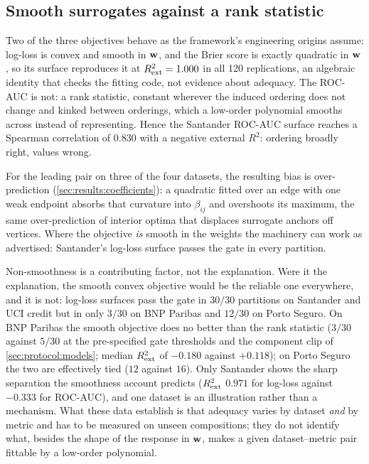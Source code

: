 \subsection{Smooth surrogates against a rank statistic}
\label{sec:disc:smooth}

Two of the three objectives behave as the framework's engineering origins assume: log-loss is convex and smooth in
$\mathbf{w}$, and the Brier score is exactly quadratic in $\mathbf{w}$, so its surface reproduces it at $R^{2}_{\mathrm{ext}} = 1.000$ in all
120 replications, an algebraic identity that checks the fitting code, not evidence about adequacy. The ROC-AUC is
not: a rank statistic, constant wherever the induced ordering does not change and kinked between orderings, which a
low-order polynomial smooths across instead of representing. Hence the Santander ROC-AUC surface reaches a Spearman
correlation of $0.830$ with a negative external $R^2$: ordering broadly right, values wrong.

For the leading pair on three of the four datasets, the resulting bias is over-prediction
(\cref{sec:results:coefficients}): a quadratic fitted over an edge with one weak endpoint absorbs that curvature into
$\beta_{ij}$ and overshoots its maximum, the same over-prediction of interior
optima that displaces surrogate anchors off vertices. Where the objective \emph{is} smooth in the weights the
machinery can work as advertised: Santander's log-loss surface passes the gate in every partition.

Non-smoothness is a contributing factor, not the explanation. Were it the explanation, the smooth convex objective
would be the reliable one everywhere, and it is not: log-loss surfaces pass the gate in $30/30$ partitions on
Santander and UCI credit but in only $3/30$ on BNP Paribas and $12/30$ on Porto Seguro. On BNP Paribas the smooth
objective does no better than the rank statistic ($3/30$ against $5/30$ at the pre-specified gate thresholds and the
component clip of \cref{sec:protocol:models}; median $R^{2}_{\mathrm{ext}}$ of $-0.180$ against $+0.118$); on Porto Seguro the two
are effectively tied ($12$ against $16$). Only Santander
shows the sharp separation the smoothness account predicts ($R^{2}_{\mathrm{ext}}$ $0.971$ for log-loss against $-0.333$ for
ROC-AUC), and one dataset is an illustration rather than a mechanism. What these data establish is that adequacy
varies by dataset \emph{and} by metric and has to be measured on unseen compositions; they do not identify what,
besides the shape of the response in $\mathbf{w}$, makes a given dataset--metric pair fittable by a low-order polynomial.

